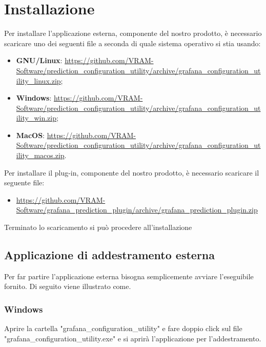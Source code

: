 \section{Installazione}
Per installare l'applicazione esterna, componente del nostro prodotto\glo, è necessario scaricare uno dei seguenti file a seconda di quale sistema operativo si stia usando:
\begin{itemize}
	\item \textbf{GNU/Linux}: \url{https://github.com/VRAM-Software/prediction_configuration_utility/archive/grafana_configuration_utility_linux.zip};
	\item \textbf{Windows}: \url{https://github.com/VRAM-Software/prediction_configuration_utility/archive/grafana_configuration_utility_win.zip};
	\item \textbf{MacOS}: \url{https://github.com/VRAM-Software/prediction_configuration_utility/archive/grafana_configuration_utility_macos.zip}.
\end{itemize}
Per installare il plug-in, componente del nostro prodotto\glo, è necessario scaricare il seguente file:
\begin{itemize}
	\item \url{https://github.com/VRAM-Software/grafana_prediction_plugin/archive/grafana_prediction_plugin.zip}
\end{itemize}
Terminato lo scaricamento si può procedere all'installazione

\subsection{Applicazione di addestramento esterna}
Per far partire l'applicazione esterna bisogna semplicemente avviare l'eseguibile fornito. Di seguito viene illustrato come.
	\subsubsection{Windows}
	Aprire la cartella "grafana\_configuration\_utility" e fare doppio click sul file "grafana\_configuration\_utility.exe" e si aprirà l'applicazione per l'addestramento.

